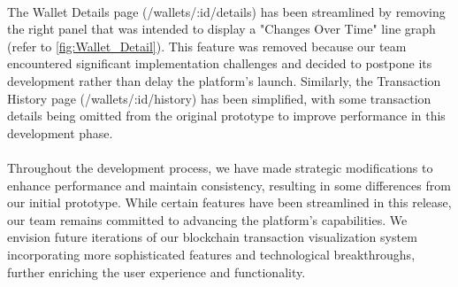 \paragraph{} The Wallet Details page (/wallets/:id/details) has been streamlined by removing the right panel that was intended to display a "Changes Over Time" line graph (refer to \ref{fig:Wallet_Detail}). This feature was removed because our team encountered significant implementation challenges and decided to postpone its development rather than delay the platform's launch. Similarly, the Transaction History page (/wallets/:id/history) has been simplified, with some transaction details being omitted from the original prototype to improve performance in this development phase.

\paragraph{} Throughout the development process, we have made strategic modifications to enhance performance and maintain consistency, resulting in some differences from our initial prototype. While certain features have been streamlined in this release, our team remains committed to advancing the platform's capabilities. We envision future iterations of our blockchain transaction visualization system incorporating more sophisticated features and technological breakthroughs, further enriching the user experience and functionality.



